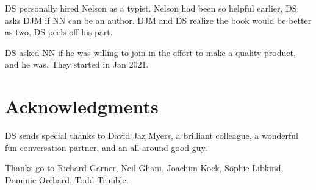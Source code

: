 \documentclass[Book-Poly]{subfiles}
\begin{document}
DS personally hired Nelson as a typist. Nelson had been so helpful earlier, DS asks DJM if NN can be an author. DJM and DS realize the book would be better as two, DS peels off his part. 

DS asked NN if he was willing to join in the effort to make a quality product, and he was. They started in Jan 2021.

\section*{Acknowledgments}



DS sends special thanks to David Jaz Myers, a brilliant colleague, a wonderful fun conversation partner, and an all-around good guy. 

Thanks go to Richard Garner, Neil Ghani, Joachim Kock, Sophie Libkind, Dominic Orchard, Todd Trimble.
\end{document}
